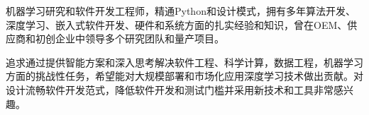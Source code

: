 \documentclass[../resume_xin.tex]{subfiles}
\begin{document}


\begin{cvparagraph}

机器学习研究和软件开发工程师，精通Python和设计模式，拥有多年算法开发、深度学习、嵌入式软件开发、硬件和系统方面的扎实经验和知识，曾在OEM、供应商和初创企业中领导多个研究团队和量产项目。

追求通过提供智能方案和深入思考解决软件工程、科学计算，数据工程，机器学习方面的挑战性任务，希望能对大规模部署和市场化应用深度学习技术做出贡献。对设计流畅软件开发范式，降低软件开发和测试门槛并采用新技术和工具非常感兴趣。

\end{cvparagraph}
\end{document}
